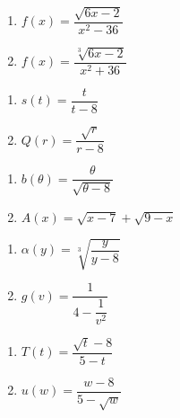 \begin{multicols}{2}
\begin{enumerate}
\setcounter{enumi}{\value{HW}}

\item  $f(x) = \dfrac{\sqrt{6x-2}}{x^2-36}$
\item  $f(x) = \dfrac{\sqrt[3]{6x-2}}{x^2+36}$

\setcounter{HW}{\value{enumi}}
\end{enumerate}
\end{multicols}

\begin{multicols}{2}
\begin{enumerate}
\setcounter{enumi}{\value{HW}}

\item $s(t) = \dfrac{t}{t - 8}$
\item $Q(r) = \dfrac{\sqrt{r}}{r - 8}$


\setcounter{HW}{\value{enumi}}
\end{enumerate}
\end{multicols}

\begin{multicols}{2}
\begin{enumerate}
\setcounter{enumi}{\value{HW}}

\item $b(\theta) = \dfrac{\theta}{\sqrt{\theta - 8}}$
\item $A(x) = \sqrt{x - 7} + \sqrt{9 - x}$

\setcounter{HW}{\value{enumi}}
\end{enumerate}
\end{multicols}

\begin{multicols}{2}
\begin{enumerate}
\setcounter{enumi}{\value{HW}}

\item $\alpha(y) = \sqrt[3]{\dfrac{y}{y - 8}}$
\item $g(v) = \dfrac{1}{4 - \dfrac{1}{v^{2}}}$

\setcounter{HW}{\value{enumi}}
\end{enumerate}
\end{multicols}

\begin{multicols}{2}
\begin{enumerate}
\setcounter{enumi}{\value{HW}}

\item $T(t) = \dfrac{\sqrt{t} - 8}{5-t}$ 
\item $u(w) = \dfrac{w - 8}{5 - \sqrt{w}}$ \label{finddomainlast}

\setcounter{HW}{\value{enumi}}
\end{enumerate}
\end{multicols}

